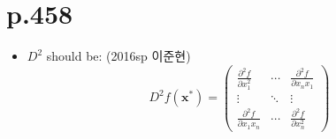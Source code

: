 \documentclass[a4paper]{article}
\begin{document}
\section{p.458} %
\label{sec:p_458}

\begin{itemize}
	\item $D^2$ should be: (2016sp 이준현)
	\[
		D^2 f(\mathbf{x^\ast}) = \begin{pmatrix}
			\frac{\partial^2 f}{\partial x_1^2} & \cdots & \frac{\partial^2 f}{\partial x_nx_1}\\
			\vdots & \ddots & \vdots \\
			\frac{\partial^2 f}{\partial x_1x_n} & \cdots & \frac{\partial^2 f}{\partial x_n^2}
		\end{pmatrix}
	\]
\end{itemize}

\end{document}
